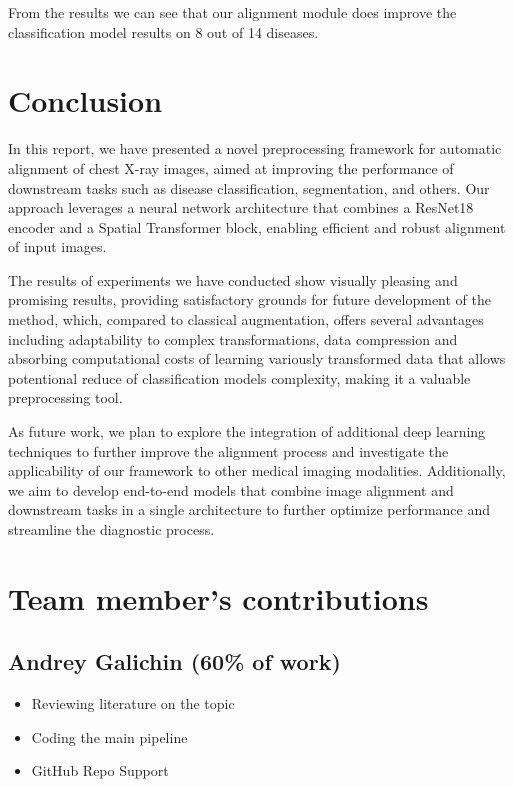 \documentclass{article}
\begin{document}
From the results we can see that our alignment module does improve the classification 
 model results on 8 out of 14 diseases.

\section{Conclusion}\label{conclusion}
In this report, we have presented a novel preprocessing framework for automatic 
alignment of chest X-ray images, aimed at improving the performance of 
downstream tasks such as disease classification, segmentation, and others. Our 
approach leverages a neural network architecture that combines a ResNet18 
encoder and a Spatial Transformer block, enabling efficient and robust 
alignment of input images.

The results of experiments we have conducted show visually pleasing and 
promising results, providing satisfactory grounds for future development of the 
method, which, compared to classical augmentation, offers several advantages
including adaptability to complex transformations, data compression and 
absorbing computational costs of learning variously transformed data that 
allows potentional reduce of classification models complexity, making it a 
valuable preprocessing tool.

As future work, we plan to explore the integration of additional deep learning 
techniques to further improve the alignment process and investigate the 
applicability of our framework to other medical imaging modalities. 
Additionally, we aim to develop end-to-end models that combine image alignment 
and downstream tasks in a single architecture to further optimize performance 
and streamline the diagnostic process.



\clearpage

\newpage
\appendix
\section{Team member's contributions}
\label{appendix-contrib}

\subsection*{Andrey Galichin (60\% of work)}
\begin{itemize}
    \item Reviewing literature on the topic
    \item Coding the main pipeline
    \item GitHub Repo Support
\end{itemize}
\end{document}
